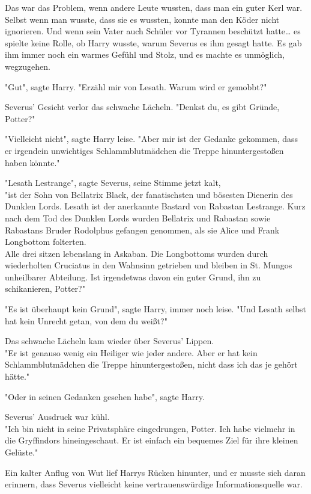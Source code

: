 {Das war das Problem, wenn andere Leute wussten, dass man ein guter Kerl war.\\ Selbst wenn man wusste, dass sie es wussten, konnte man den Köder nicht ignorieren. Und wenn sein Vater auch Schüler vor Tyrannen beschützt hatte… es spielte keine Rolle, ob Harry wusste, warum Severus es ihm gesagt hatte. Es gab ihm immer noch ein warmes Gefühl und Stolz, und es machte es unmöglich, wegzugehen.

"Gut", sagte Harry. "Erzähl mir von Lesath. Warum wird er gemobbt?"

Severus' Gesicht verlor das schwache Lächeln. "Denkst du, es gibt Gründe, Potter?"

"Vielleicht nicht", sagte Harry leise. "Aber mir ist der Gedanke gekommen, dass er irgendein unwichtiges Schlammblutmädchen die Treppe hinuntergestoßen haben könnte."

"Lesath Lestrange", sagte Severus, seine Stimme jetzt kalt,\\ "ist der Sohn von Bellatrix Black, der fanatischsten und bösesten Dienerin des Dunklen Lords. Lesath ist der anerkannte Bastard von Rabastan Lestrange. Kurz nach dem Tod des Dunklen Lords wurden Bellatrix und Rabastan sowie Rabastans Bruder Rodolphus gefangen genommen, als sie Alice und Frank Longbottom folterten.\\ Alle drei sitzen lebenslang in Askaban. Die Longbottoms wurden durch wiederholten Cruciatus in den Wahnsinn getrieben und bleiben in St. Mungos unheilbarer Abteilung. Ist irgendetwas davon ein guter Grund, ihn zu schikanieren, Potter?"

"Es ist überhaupt kein Grund", sagte Harry, immer noch leise. "Und Lesath selbst hat kein Unrecht getan, von dem du weißt?"

Das schwache Lächeln kam wieder über Severus' Lippen.\\ "Er ist genauso wenig ein Heiliger wie jeder andere. Aber er hat kein Schlammblutmädchen die Treppe hinuntergestoßen, nicht dass ich das je gehört hätte."

"Oder in seinen Gedanken gesehen habe", sagte Harry.

Severus' Ausdruck war kühl.\\ "Ich bin nicht in seine Privatsphäre eingedrungen, Potter. Ich habe vielmehr in die Gryffindors hineingeschaut. Er ist einfach ein bequemes Ziel für ihre kleinen Gelüste."

Ein kalter Anflug von Wut lief Harrys Rücken hinunter, und er musste sich daran erinnern, dass Severus vielleicht keine vertrauenswürdige Informationsquelle war.

}
